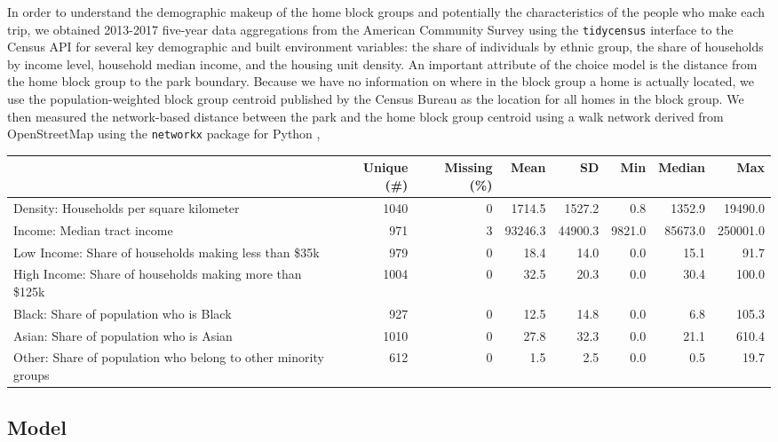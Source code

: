 \documentclass[]{elsarticle} %
\begin{document}
In order to understand the demographic makeup of the home block groups and
potentially the characteristics of the people who make each trip, we obtained
2013-2017 five-year data aggregations from the American Community Survey
using the \texttt{tidycensus} \citep{Walker2019} interface to the
Census API for several key demographic and built environment variables: the
share of individuals by ethnic group, the share of households by income level,
household median income, and the housing unit density. An important attribute of
the choice model is the distance from the home block group to the park boundary.
Because we have no information on where in the block group a home is actually
located, we use the population-weighted block group centroid published by the
Census Bureau as the location for all homes in the block group. We then measured
the network-based distance between the park and the home block group centroid
using a walk network derived from OpenStreetMap using the \texttt{networkx} package
for Python \citep{networkx},

\begin{table}[H]
\centering
\begin{tabular}[t]{lrrrrrrr}
\toprule
  & Unique (\#) & Missing (\%) & Mean & SD & Min & Median & Max\\
\midrule
Density: Households per square kilometer & 1040 & 0 & 1714.5 & 1527.2 & 0.8 & 1352.9 & 19490.0\\
Income: Median tract income & 971 & 3 & 93246.3 & 44900.3 & 9821.0 & 85673.0 & 250001.0\\
Low Income: Share of households making less than \$35k & 979 & 0 & 18.4 & 14.0 & 0.0 & 15.1 & 91.7\\
High Income: Share of households making more than \$125k & 1004 & 0 & 32.5 & 20.3 & 0.0 & 30.4 & 100.0\\
Black: Share of population who is Black & 927 & 0 & 12.5 & 14.8 & 0.0 & 6.8 & 105.3\\
Asian: Share of population who is Asian & 1010 & 0 & 27.8 & 32.3 & 0.0 & 21.1 & 610.4\\
Other: Share of population who belong to other minority groups & 612 & 0 & 1.5 & 2.5 & 0.0 & 0.5 & 19.7\\
\bottomrule
\end{tabular}
\end{table}

\hypertarget{model}{%
\subsection{Model}\label{model}}
\end{document}
